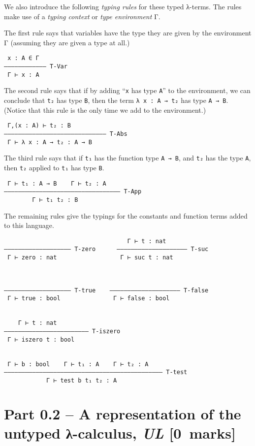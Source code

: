 \documentclass[11pt]{article}
\theoremstyle{definition}
\begin{document}
We also introduce the following \emph{typing rules} for these typed λ-terms.
The rules make use of a \emph{typing context} or \emph{type environment} Γ.

The first rule says that variables have the type they are given
by the environment Γ (assuming they are given a type at all.)
\begin{verbatim}
 x : A ∈ Γ
–––––––––––– T-Var
 Γ ⊢ x : A
\end{verbatim}

The second rule says that if by adding “\texttt{x} has type \texttt{A}” to the environment,
we can conclude that \texttt{t₂} has type \texttt{B}, then
the term \texttt{λ x : A → t₂} has type \texttt{A → B}.
(Notice that this rule is the only time we add to the environment.)
\begin{verbatim}
 Γ,(x : A) ⊢ t₂ : B
––––––––––––––––––––––––––––– T-Abs
 Γ ⊢ λ x : A → t₂ : A → B
\end{verbatim}

The third rule says that if \texttt{t₁} has the function type \texttt{A → B},
and \texttt{t₂} has the type \texttt{A}, then \texttt{t₂} applied to \texttt{t₁} has type \texttt{B}.
\begin{verbatim}
 Γ ⊢ t₁ : A → B    Γ ⊢ t₂ : A
––––––––––––––––––––––––––––––––– T-App
        Γ ⊢ t₁ t₂ : B
\end{verbatim}

The remaining rules give the typings for the constants and
function terms added to this language.
\begin{verbatim}
                                   Γ ⊢ t : nat
––––––––––––––––––– T-zero      –––––––––––––––––––– T-suc
 Γ ⊢ zero : nat                  Γ ⊢ suc t : nat
                            
                            
                         
––––––––––––––––––– T-true    –––––––––––––––––––– T-false
 Γ ⊢ true : bool               Γ ⊢ false : bool


    Γ ⊢ t : nat
–––––––––––––––––––––––– T-iszero
 Γ ⊢ iszero t : bool 


 Γ ⊢ b : bool    Γ ⊢ t₁ : A    Γ ⊢ t₂ : A
––––––––––––––––––––––––––––––––––––––––––––– T-test
            Γ ⊢ test b t₁ t₂ : A
\end{verbatim}

\section*{Part 0.2 – A representation of the untyped λ-calculus, \emph{UL}    [0 marks]}
\label{sec:org21e5a71}
\end{document}
